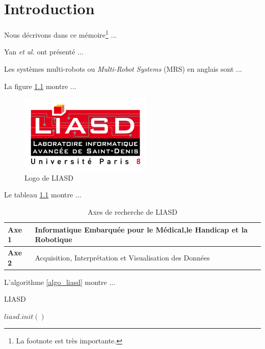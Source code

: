 \chapter{Introduction}

Nous décrivons dans ce mémoire\footnote{La footnote est très importante.} ...

Yan \emph{et al.} \cite{yz10isr} ont présenté ...

Les systèmes multi-robots ou \emph{Multi-Robot Systems} (MRS) en anglais  sont ... 

La figure \ref{figure_liasd_logo} montre ...

\begin{figure}[thpb]
  \centering
  \includegraphics[scale=0.60]{liasd.png}
  \caption{Logo de LIASD}
  \label{figure_liasd_logo}
\end{figure}

Le tableau \ref{table_liasd_axes} montre ...

\begin{table}[thpb]
  \caption{Axes de recherche de LIASD}
  \label{table_liasd_axes}
  \centering
  \begin{tabular}{l||p{6.0cm}}
    \hline
    \bfseries Axe 1 & Informatique Embarquée pour le Médical,le Handicap et la Robotique\\
    \hline
    \bfseries Axe 2 & Acquisition, Interprétation et Visualisation des Données\\
    \hline
  \end{tabular}
\end{table}

L'algorithme \ref{algo_liasd} montre ...

\begin{algorithm}
  \caption{LIASD}
  \label{algo_liasd}
  \begin{algorithmic}[1]
    \STATE $liasd.init()$
  \end{algorithmic}
\end{algorithm}
